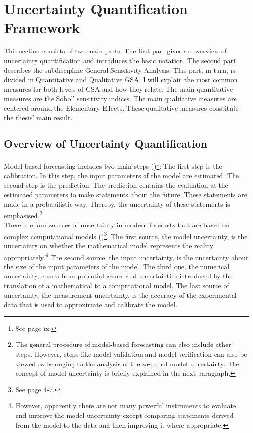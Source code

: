 \documentclass[a4paper,12pt]{article}
\begin{document}
\newpage %

\section{Uncertainty Quantification Framework}
\thispagestyle{plain} %

This section consists of two main parts. The first part gives an overview of uncertainty quantification and introduces the basic notation. The second part describes the subdiscipline General Sensitivity Analysis. This part, in turn, is divided in Quantitative and Qualitative GSA. I will explain the most common measures for both levels of GSA and how they relate. The main quantitative measures are the Sobol' sensitivity indices. The main qualitative measures are centered around the Elementary Effects.
These qualitative measures constitute the thesis' main result.

\subsection{Overview of Uncertainty Quantification}
Model-based forecasting includes two main steps (\cite{Smith.2014})\footnote{See page ix.}: The first step is the calibration. In this step, the input parameters of the model are estimated. The second step is the prediction. The prediction contains the evaluation at the estimated parameters to make statements about the future. These statements are made in a probabilistic way. Thereby, the uncertainty of these statements is emphasised.\footnote{The general procedure of model-based forecasting can also include other steps. However, steps like model validation and model verification can also be viewed as belonging to the analysis of the so-called model uncertainty. The concept of model uncertainty is briefly explained in the next paragraph.}\\
\newline
There are four sources of uncertainty in modern forecasts that are based on complex computational models (\cite{Smith.2014})\footnote{See page 4-7.}. The first source, the model uncertainty, is the uncertainty on whether the mathematical model represents the reality appropriately.\footnote{However, apparently there are not many powerful instruments to evaluate and improve the model uncertainty except comparing statements derived from the model to the data and then improving it where appropriate.} The second source, the input uncertainty, is the uncertainty about the size of the input parameters of the model. The third one, the numerical uncertainty, comes from potential errors and uncertainties introduced by the translation of a mathematical to a computational model. The last source of uncertainty, the measurement uncertainty, is the accuracy of the experimental data that is used to approximate and calibrate the model.
\end{document}

